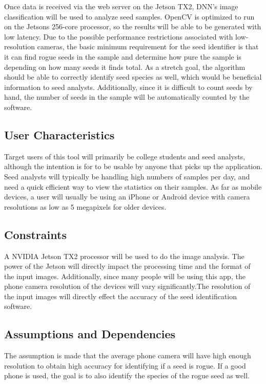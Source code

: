 \documentclass[onecolumn, draftclsnofoot,10pt, compsoc]{IEEEtran}
\begin{document}
Once data is received via the web server on the Jetson TX2, DNN's image classification will be used to analyze seed samples. OpenCV is optimized to run on the Jetsons 256-core processor, so the results will be able to be generated with low latency. Due to the possible performance restrictions associated with low-resolution cameras, the basic minimum requirement for the seed identifier is that it can find rogue seeds in the sample and determine how pure the sample is depending on how many seeds it finds total. As a stretch goal, the algorithm should be able to correctly identify seed species as well, which would be beneficial information to seed analysts. Additionally, since it is difficult to count seeds by hand, the number of seeds in the sample will be automatically counted by the software. 

\subsection{User Characteristics}
Target users of this tool will primarily be college students and seed analysts, although the intention is for to be usable by anyone that picks up the application. Seed analysts will typically be handling high numbers of samples per day, and need a quick efficient way to view the statistics on their samples. As far as mobile devices, a user will usually be using an iPhone or Android device with camera resolutions as low as 5 megapixels for older devices. 

\subsection{Constraints}
A NVIDIA Jetson TX2 processor will be used to do the image analysis.
The power of the Jetson will directly impact the processing time and the format of the input images. Additionally, since many people will be using this app, the phone camera resolution of the devices will vary significantly.The resolution of the input images will directly effect the accuracy of the seed identification software. 

\subsection{Assumptions and Dependencies}
The assumption is made that the average phone camera will have high enough resolution to obtain high accuracy for identifying if a seed is rogue. If a good phone is used, the goal is to also identify the species of the rogue seed as well. 
\end{document}

